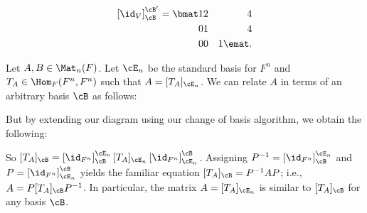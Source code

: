 \begin{example}
\begin{enumerate}[label = (\arabic*)]
                \begin{equation*}
                \begin{split}
                    \left[ \id_V \right]_\cB^{\cB'} = 
                    \bmat
                    1 & 2 & 4 \\
                    0 & 1 & 4 \\
                    0 & 0 & 1 
                    \emat.
                \end{split}
                \end{equation*}
        \end{enumerate}
    \end{example}

    \begin{example}\label{example:similar-matrices}
        Let $A,B \in \Mat_n(F)$. Let $\cE_n$ be the standard basis for $F^n$ and $T_A \in \Hom_F{(F^n,F^n)}$ such that $A = [T_A]_{\cE_n}$. We can relate $A$ in terms of an arbitrary basis $\cB$ as follows:
            \begin{center}
            \end{center}
        But by extending our diagram using our change of basis algorithm, we obtain the following:
            \begin{center}
            \end{center}
        So $[T_A]_\cB = \left[ \id_{F^n} \right]_\cB^{\cE_n} [T_A]_{\cE_n} \left[ \id_{F^n} \right]^\cB_{\cE_n}$. Assigning $P^{-1} = \left[ \id_{F^n} \right]_\cB^{\cE_n}$ and $P = \left[ \id_{F^n} \right]^\cB_{\cE_n}$ yields the familiar equation $[T_A]_\cB = P^{-1}A P$; i.e., $A = P [T_A]_\cB P^{-1}$. In particular, the matrix $A = [T_A]_{\cE_n}$ is similar to $[T_A]_\cB$ for any basis $\cB$.
    \end{example}

